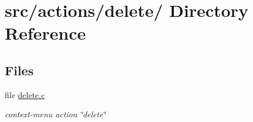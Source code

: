 \hypertarget{dir_000016}{
\section{src/actions/delete/ Directory Reference}
\label{dir_000016}
}
\subsection*{Files}
\begin{CompactItemize}
\item 
file \hyperlink{delete_8c}{delete.c}
\begin{CompactList}\small\item\em context-menu action \char`\"{}delete\char`\"{} \item\end{CompactList}

\end{CompactItemize}
